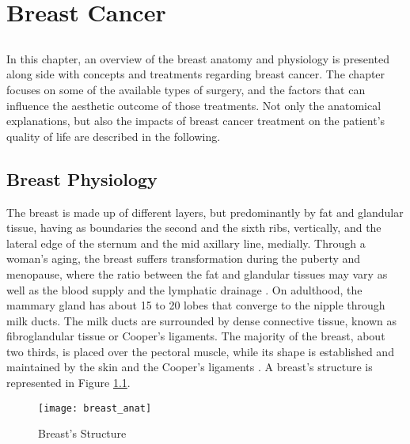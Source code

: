 \chapter{Breast Cancer}\label{chap:breastcancer}

\section*{}

In this chapter, an overview of the breast anatomy and physiology is presented along side with concepts and treatments regarding breast cancer. The chapter focuses on some of the available types of surgery, and the factors that can influence the aesthetic outcome of those treatments. Not only the anatomical explanations, but also the impacts of breast cancer treatment on the patient's quality of life are described in the following.

\section{Breast Physiology} \label{sec:physiology}

The breast is made up of different layers, but predominantly by fat and glandular tissue, having as boundaries the second and the sixth ribs, vertically, and the lateral edge of the sternum and the mid axillary line, medially. Through a woman's aging, the breast suffers transformation during the puberty and menopause, where the ratio between the fat and glandular tissues may vary as well as the blood supply and the lymphatic drainage \cite{Ellis2013}.
On adulthood, the mammary gland has about 15 to 20 lobes that converge to the nipple through milk ducts. The milk ducts are surrounded by dense connective tissue, known as fibroglandular tissue or Cooper's ligaments. The majority of the breast, about two thirds, is placed over the pectoral muscle, while its shape is established and maintained by the skin and the Cooper's ligaments \cite{apenn,Vavourakis2016}. A breast's structure is represented in Figure \ref{fig:breast structure}.

\begin{figure}[H]
\begin{center}
	\leavevmode
    \texttt{[image: breast\_anat]}
    \caption[Breast Structure]{Breast's Structure \cite{Witmer2004}}
    \label{fig:breast structure}
\end{center}
\end{figure}

